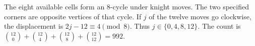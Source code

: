 The eight available cells form an 8-cycle under knight moves. The two specified corners are opposite vertices of that cycle. If $j$ of the twelve moves go clockwise, the displacement is $2j-12\equiv4\pmod8$. Thus $j\in\{0,4,8,12\}$. The count is $\binom{12}0+\binom{12}4+\binom{12}8+\binom{12}{12}=\boxed{992}$.

